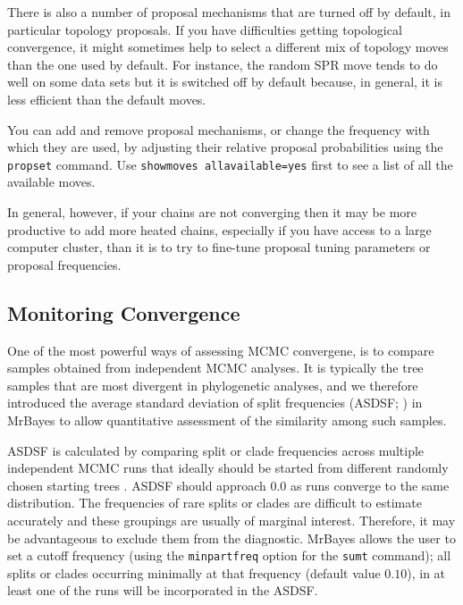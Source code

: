 \documentclass[12pt]{book}
\newcommand{\ttt}[1]{\texttt{#1}}
\begin{document}
There is also a number of proposal mechanisms that are turned off by default, in particular
topology proposals. If you have difficulties getting topological convergence, it might sometimes
help to select a different mix of topology moves than the one used by default. For instance, the
random SPR move tends to do well on some data sets but it is switched off by default because, in
general, it is less efficient than the default moves.

You can add and remove proposal mechanisms, or change the frequency with which they are used, by
adjusting their relative proposal probabilities using the \ttt{propset} command. Use \ttt{showmoves
allavailable=yes} first to see a list of all the available moves.

In general, however, if your chains are not converging then it may be more productive to add more
heated chains, especially if you have access to a large computer cluster, than it is to try to
fine-tune proposal tuning parameters or proposal frequencies.


\subsection{Monitoring Convergence}
\label{monitoringConvergence}

One of the most powerful ways of assessing MCMC convergene, is to compare samples obtained from
independent MCMC analyses. It is typically the tree samples that are most divergent in phylogenetic
analyses, and we therefore introduced the average standard deviation of split frequencies (ASDSF;
\citep{lakner08}) in MrBayes to allow quantitative assessment of the similarity among such samples.

ASDSF is calculated by comparing split or clade frequencies across multiple independent MCMC runs
that ideally should be started from different randomly chosen starting trees \citep{lakner08}.
ASDSF should approach $0.0$ as runs converge to the same distribution. The frequencies of rare
splits or clades are difficult to estimate accurately and these groupings are usually of marginal
interest. Therefore, it may be advantageous to exclude them from the diagnostic. MrBayes allows the
user to set a cutoff frequency (using the \ttt{minpartfreq} option for the \ttt{sumt} command); all
splits or clades occurring minimally at that frequency (default value $0.10$), in at least one of
the runs will be incorporated in the ASDSF.
\end{document}
